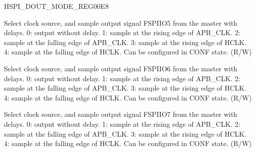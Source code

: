 \begin{register}{H}{SPI\_DOUT\_MODE\_REG}{\hexprefix{}00E8}
\begin{regdesc}
\begin{reglist}
\label{fielddesc:SPIDOUT5MODE}\item [SPI\_DOUT5\_MODE] Select clock source, and sample output signal FSPIIO5 from the master with delays. 0: output without delay. 1: sample at the rising edge of APB\_CLK. 2: sample at the falling edge of APB\_CLK. 3: sample at the rising edge of HCLK. 4: sample at the falling edge of HCLK. Can be configured in CONF state. (R/W)
\label{fielddesc:SPIDOUT6MODE}\item [SPI\_DOUT6\_MODE] Select clock source, and sample output signal FSPIIO6 from the master with delays. 0: output without delay. 1: sample at the rising edge of APB\_CLK. 2: sample at the falling edge of APB\_CLK. 3: sample at the rising edge of HCLK. 4: sample at the falling edge of HCLK. Can be configured in CONF state. (R/W)
\label{fielddesc:SPIDOUT7MODE}\item [SPI\_DOUT7\_MODE] Select clock source, and sample output signal FSPIIO7 from the master with delays. 0: output without delay. 1: sample at the rising edge of APB\_CLK. 2: sample at the falling edge of APB\_CLK. 3: sample at the rising edge of HCLK. 4: sample at the falling edge of HCLK. Can be configured in CONF state. (R/W)
\end{reglist}\end{regdesc}
\end{register}


